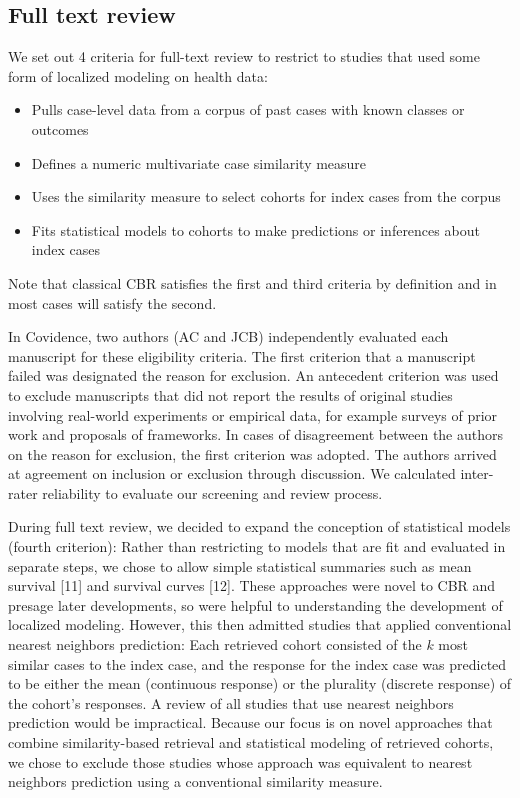 \documentclass[preprint, 3p,
authoryear]{elsarticle} %
\providecommand{\tightlist}{%
  \setlength{\itemsep}{0pt}\setlength{\parskip}{0pt}}
\begin{document}
\hypertarget{full-text-review}{%
\subsection{Full text review}\label{full-text-review}}

We set out 4 criteria for full-text review to restrict to studies that
used some form of localized modeling on health data:

\begin{itemize}
\tightlist
\item
  Pulls case-level data from a corpus of past cases with known classes
  or outcomes
\item
  Defines a numeric multivariate case similarity measure
\item
  Uses the similarity measure to select cohorts for index cases from the
  corpus
\item
  Fits statistical models to cohorts to make predictions or inferences
  about index cases
\end{itemize}

Note that classical CBR satisfies the first and third criteria by
definition and in most cases will satisfy the second.

In Covidence, two authors (AC and JCB) independently evaluated each
manuscript for these eligibility criteria. The first criterion that a
manuscript failed was designated the reason for exclusion. An antecedent
criterion was used to exclude manuscripts that did not report the
results of original studies involving real-world experiments or
empirical data, for example surveys of prior work and proposals of
frameworks. In cases of disagreement between the authors on the reason
for exclusion, the first criterion was adopted. The authors arrived at
agreement on inclusion or exclusion through discussion. We calculated
inter-rater reliability to evaluate our screening and review process.

During full text review, we decided to expand the conception of
statistical models (fourth criterion): Rather than restricting to models
that are fit and evaluated in separate steps, we chose to allow simple
statistical summaries such as mean survival {[}11{]} and survival curves
{[}12{]}. These approaches were novel to CBR and presage later
developments, so were helpful to understanding the development of
localized modeling. However, this then admitted studies that applied
conventional nearest neighbors prediction: Each retrieved cohort
consisted of the \(k\) most similar cases to the index case, and the
response for the index case was predicted to be either the mean
(continuous response) or the plurality (discrete response) of the
cohort's responses. A review of all studies that use nearest neighbors
prediction would be impractical. Because our focus is on novel
approaches that combine similarity-based retrieval and statistical
modeling of retrieved cohorts, we chose to exclude those studies whose
approach was equivalent to nearest neighbors prediction using a
conventional similarity measure.
\end{document}
